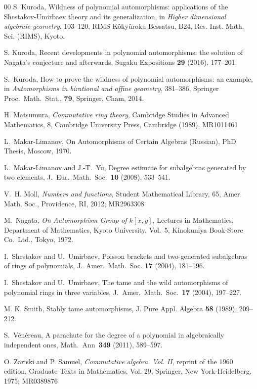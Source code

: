 \documentclass{amsart}
\theoremstyle{plain}
\theoremstyle{definition}
\begin{document}
\begin{thebibliography}{00}
S. Kuroda, Wildness of polynomial automorphisms: applications of the Shestakov-Umirbaev theory and its generalization, in {\it Higher dimensional algebraic geometry}, 103--120, RIMS K\^{o}ky\^{u}roku Bessatsu, B24, 
Res. Inst. Math. Sci. (RIMS), Kyoto.


S. Kuroda, 
Recent developments in polynomial automorphisms: the solution of Nagata's conjecture and afterwards, 
Sugaku Expositions {\bf 29} (2016), 
177--201.


S.~Kuroda, 
How to prove the wildness of polynomial automorphisms: 
an example, 
in {\it Automorphisms in birational and affine geometry}, 381--386, 
Springer Proc.\ Math.\ Stat., {\bf 79}, Springer, Cham, 2014. 


H. Matsumura, 
{\it Commutative ring theory}, 
Cambridge Studies in Advanced Mathematics, 8, 
Cambridge University Press, Cambridge (1989). MR1011461


L.\ Makar-Limanov, 
On Automorphisms of Certain Algebras (Russian), PhD Thesis, 
Moscow, 1970. 


L.~Makar-Limanov and J.-T.~Yu, 
Degree estimate for subalgebras generated by two elements, 
J.\ Eur.\ Math.\ Soc.\ {\bf 10} (2008), 533--541. 


V.~H. Moll, 
{\it Numbers and functions}, Student Mathematical Library, 65, 
Amer. Math. Soc., Providence, RI, 2012; MR2963308



M.~Nagata, 
{\it On Automorphism Group of $k[x,y]$}, 
Lectures in Mathematics, Department of Mathematics, 
Kyoto University, Vol.\ 5, 
Kinokuniya Book-Store Co.\ Ltd., Tokyo, 1972. 


I.~Shestakov and U.~Umirbaev, 
Poisson brackets and two-generated subalgebras 
of rings of polynomials, 
J.\ Amer.\ Math.\ Soc. {\bf 17} (2004), 181--196.

I.~Shestakov and U.~Umirbaev, 
The tame and the wild automorphisms of polynomial rings 
in three variables, 
J.\ Amer.\ Math.\ Soc.\ {\bf 17} (2004), 197--227. 


M. K. Smith, 
Stably tame automorphisms, 
J. Pure Appl. Algebra {\bf 58} (1989), 
209--212. 



S.~V\'en\'ereau, 
A parachute for the degree of
a polynomial in algebraically independent ones, 
Math.\ Ann\ {\bf 349} (2011), 589--597.


O. Zariski and P. Samuel, 
{\it Commutative algebra. Vol. II}, reprint of the 1960 edition, 
Graduate Texts in Mathematics, Vol. 29, 
Springer, New York-Heidelberg, 1975; MR0389876



\end{thebibliography}
\end{document}
